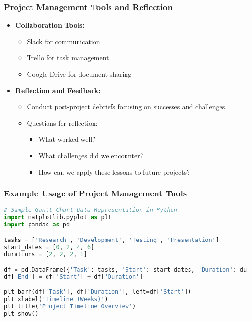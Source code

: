 \documentclass[aspectratio=169]{beamer}
\begin{document}
\begin{frame}[fragile]
    \frametitle{Project Management Tools and Reflection}
    \begin{itemize}
        \item \textbf{Collaboration Tools:}
            \begin{itemize}
                \item Slack for communication
                \item Trello for task management
                \item Google Drive for document sharing
            \end{itemize}
        \item \textbf{Reflection and Feedback:}
            \begin{itemize}
                \item Conduct post-project debriefs focusing on successes and challenges.
                \item Questions for reflection:
                    \begin{itemize}
                        \item What worked well?
                        \item What challenges did we encounter?
                        \item How can we apply these lessons to future projects?
                    \end{itemize}
            \end{itemize}
    \end{itemize}
\end{frame}

\begin{frame}[fragile]
    \frametitle{Example Usage of Project Management Tools}
    \begin{lstlisting}[language=Python]
# Sample Gantt Chart Data Representation in Python
import matplotlib.pyplot as plt
import pandas as pd

tasks = ['Research', 'Development', 'Testing', 'Presentation']
start_dates = [0, 2, 4, 6]
durations = [2, 2, 2, 1]

df = pd.DataFrame({'Task': tasks, 'Start': start_dates, 'Duration': durations})
df['End'] = df['Start'] + df['Duration']

plt.barh(df['Task'], df['Duration'], left=df['Start'])
plt.xlabel('Timeline (Weeks)')
plt.title('Project Timeline Overview')
plt.show()
    \end{lstlisting}
\end{frame}
\end{document}
